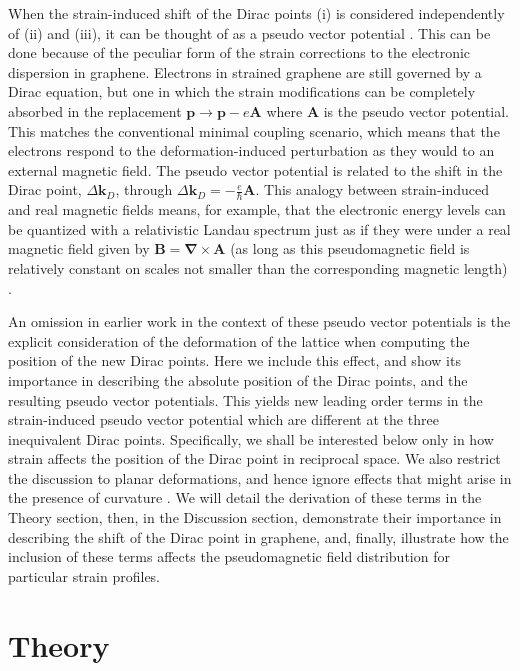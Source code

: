 When the strain-induced shift of the Dirac points (i) is considered independently of (ii) and (iii), it can be thought of as a pseudo vector potential \cite{Sasaki2005,Ando2006,Manes2007,CastroNeto2009,Vozmediano2010}.
This can be done because of the peculiar form of the strain corrections to the electronic dispersion in graphene.
Electrons in strained graphene are still governed by a Dirac equation, but one in which the strain modifications can be completely absorbed in the replacement $\bm{p} \to \bm{p}-e\bm{A}$ where $\bm{A}$ is the pseudo vector potential.
This matches the conventional minimal coupling scenario, which means that the electrons respond to the deformation-induced perturbation as they would to an external magnetic field.  
The pseudo vector potential is related to the shift in the Dirac point, $\Delta \bm{k}_D$, through $\Delta \bm{k}_D=-\frac{e}{\hbar} \bm{A}$.
This analogy between strain-induced and real magnetic fields means, for example, that the electronic energy levels can be quantized with a relativistic Landau spectrum just as if they were under a real magnetic field given by $\bm{B}=\bm{\nabla}\times\bm{A}$ (as long as this pseudomagnetic field is relatively constant on scales not smaller than the corresponding magnetic length) \cite{CastroNeto2009}.

An omission in earlier work in the context of these pseudo vector potentials is the explicit consideration of the deformation of the lattice when computing the position of the new Dirac points.
Here we include this effect, and show its importance in describing the absolute position of the Dirac points, and the resulting pseudo vector potentials.
This yields new leading order terms in the strain-induced pseudo vector potential which are different at the three inequivalent Dirac points.
Specifically, we shall be interested below only in how strain affects the position of the Dirac point in reciprocal space.
We also restrict the discussion to planar deformations, and hence ignore effects that might arise in the presence of curvature \cite{CastroNeto2009,Vozmediano2010}.
We will detail the derivation of these terms in the Theory section, then, in the Discussion section, demonstrate their importance in describing the shift of the Dirac point in graphene, and, finally, illustrate how the inclusion of these terms affects the pseudomagnetic field distribution for particular strain profiles. 

\section{Theory}

